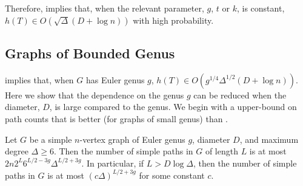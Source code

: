 \documentclass[lotsofwhite]{patmorin}
\begin{document}
Therefore,  implies that,
when the relevant parameter, $g$, $t$ or $k$, is constant, $h(T)\in
O(\sqrt{\Delta}(D+\log n))$ with high probability.  



\subsection{Graphs of Bounded Genus}

 implies that, when $G$ has Euler genus
$g$, $h(T)\in O(g^{1/4}\Delta^{1/2}(D+\log n))$.  Here we show that
the dependence on the genus $g$ can be reduced when the diameter, $D$,
is large compared to the genus.  We begin with a upper-bound on path
counts that is better (for graphs of small genus) than 
.

\begin{lem}
   Let $G$ be a simple $n$-vertex graph of Euler genus $g$, diameter
   $D$, and maximum degree $\Delta\ge 6$. Then the number of simple paths
   in $G$ of length $L$ is at most $2n2^{L}6^{L/2-3g}\Delta^{L/2+3g}$.
   In particular, if $L>D\log\Delta$, then the number of simple paths
   in $G$ is at most $(c\Delta)^{L/2+3g}$ for some constant $c$.
\end{lem}
\end{document}
